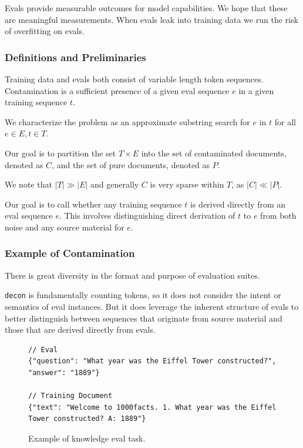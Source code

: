 \documentclass[table]{ai2style/ai2}
\begin{document}
{{Evals provide measurable outcomes for model capabilities. We hope that these are meaningful measurements. When evals leak into training data we run the risk of overfitting on evals.

\subsubsection{Definitions and Preliminaries}

Training data and evals both consist of variable length token sequences. Contamination is a sufficient presence of a given eval sequence $e$ in a given training sequence $t$.

We characterize the problem as an approximate substring search for $e$ in $t$ for all $e \in E, t \in T$.

Our goal is to partition the set $T \times E$ into the set of contaminated documents, denoted as $C$, and the set of pure documents, denoted as $P$.

We note that $|T| \gg |E|$ and generally $C$ is very sparse within $T$, as $|C| \ll |P|$.

Our goal is to call whether any training sequence $t$ is derived directly from an eval sequence $e$. This involves distinguishing direct derivation of $t$ to $e$ from both noise and any source material for $e$.

\subsubsection{Example of Contamination}

There is great diversity in the format and purpose of evaluation suites.

\texttt{decon} is fundamentally counting tokens, so it does not consider the intent or semantics of eval instances. But it does leverage the inherent structure of evals to better distinguish between sequences that originate from source material and those that are derived directly from evals.

\begin{figure}[ht]
\begin{lstlisting}
// Eval
{"question": "What year was the Eiffel Tower constructed?", "answer": "1889"}

// Training Document
{"text": "Welcome to 1000facts. 1. What year was the Eiffel Tower constructed? A: 1889"}
\end{lstlisting}
\caption{Example of knowledge eval task.}
\label{fig:json-config}
\end{figure}

}}
\end{document}
